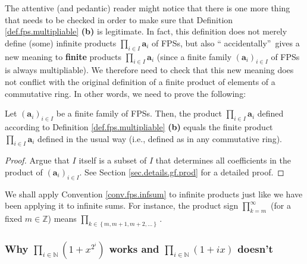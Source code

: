 The attentive (and pedantic) reader might notice that there is one more thing
that needs to be checked in order to make sure that Definition
\ref{def.fps.multipliable} \textbf{(b)} is legitimate. In fact, this
definition does not merely define (some) infinite products $\prod_{i\in
I}\mathbf{a}_{i}$ of FPSs, but also \textquotedblleft
accidentally\textquotedblright\ gives a new meaning to \textbf{finite}
products $\prod_{i\in I}\mathbf{a}_{i}$ (since a finite family $\left(
\mathbf{a}_{i}\right)  _{i\in I}$ of FPSs is always multipliable). We
therefore need to check that this new meaning does not conflict with the
original definition of a finite product of elements of a commutative ring. In
other words, we need to prove the following:

\begin{proposition}
\label{prop.fps.multipliable.prod-wd2}Let $\left(  \mathbf{a}_{i}\right)
_{i\in I}$ be a finite family of FPSs. Then, the product $\prod_{i\in
I}\mathbf{a}_{i}$ defined according to Definition \ref{def.fps.multipliable}
\textbf{(b)} equals the finite product $\prod_{i\in I}\mathbf{a}_{i}$ defined
in the usual way (i.e., defined as in any commutative ring).
\end{proposition}

\begin{proof}
Argue that $I$ itself is a subset of $I$ that determines all coefficients in
the product of $\left(  \mathbf{a}_{i}\right)  _{i\in I}$. See Section
\ref{sec.details.gf.prod} for a detailed proof.
\end{proof}

We shall apply Convention \ref{conv.fps.infsum} to infinite products just like
we have been applying it to infinite sums. For instance, the product sign
$\prod\limits_{k=m}^{\infty}$ (for a fixed $m\in\mathbb{Z}$) means
$\prod\limits_{k\in\left\{  m,m+1,m+2,\ldots\right\}  }$.

\subsubsection{Why $\prod_{i\in\mathbb{N}}\left(  1+x^{2^{i}}\right)  $ works
and $\prod_{i\in\mathbb{N}}\left(  1+ix\right)  $ doesn't}

